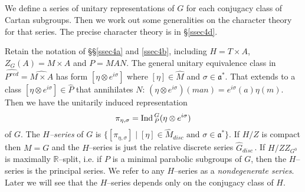 \documentclass{conm-p-l}
\def\ga{\mathfrak{a}}
\def\Ind{{\rm Ind\,}}
\def\R{\mathbb{R}}
\begin{document}
\subsection{}\label{ssec4c}\setcounter{equation}{0}
We define a series of unitary representations of $G$ for each conjugacy class
of Cartan subgroups.  Then we work out some generalities on the character
theory for that series.  The precise character theory is in \S \ref{ssec4d}.

Retain the notation of \S\S \ref{ssec4a} and \ref{ssec4b}, including
$H = T \times A$, $Z_G(A) = M\times A$ and $P = MAN$.  The general unitary
equivalence class in $\widehat{P^{red}} = \widehat{M\times A}$ has form
$[\eta\otimes e^{i\sigma}]$ where $[\eta] \in \widehat{M}$ and
$\sigma \in \ga^*$.  That extends to a class $[\eta\otimes e^{i\sigma}]
\in \widehat{P}$ that annihilates $N$: $(\eta\otimes e^{i\sigma})(man) =
e^{i\sigma}(a)\eta(m)$.  Then we have the unitarily induced representation
\begin{equation}\label{4.3.1}
\pi_{\eta,\sigma} = \Ind_P^G(\eta\otimes e^{i\sigma})
\end{equation}
of $G$.  The {\em $H$--series} of $G$ is $\{[\pi_{\eta,\sigma}] \mid
[\eta] \in \widehat{M}_{disc} \text{ and } \sigma \in \ga^*\}$.  If
$H/Z$ is compact then $M = G$ and the $H$--series is just the relative 
discrete series $\widehat{G}_{disc}$\,.  If $H/ZZ_{G^0}$ is maximally
$\R$--split, i.e. if $P$ is a minimal parabolic subgroups of $G$, then
the $H$--series is the principal series.  We refer to any $H$--series
as a {\em nondegenerate series}.  Later we will see that the $H$--series
depends only on the conjugacy class of $H$.
\end{document}
